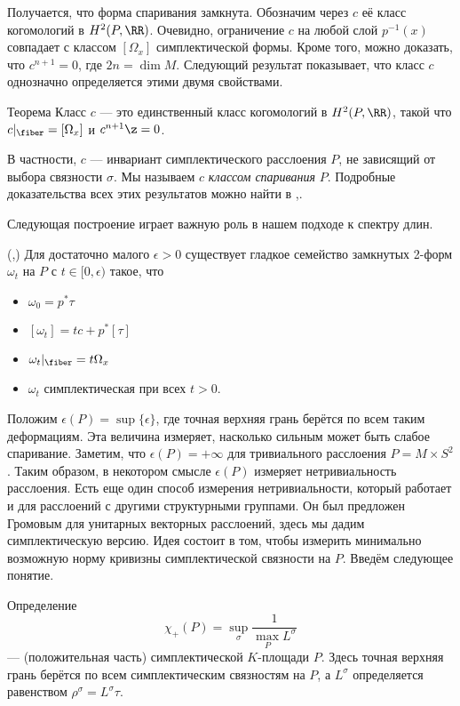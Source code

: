 Получается, что форма спаривания замкнута.
Обозначим через $c$ её класс когомологий в $H^2 (P, \RR)$.
Очевидно, ограничение $c$ на любой слой $p^{-1}(x)$ совпадает с классом $[\Omega_x]$ симплектической формы.
Кроме того, можно доказать, что $c^{n+1} = 0$, где $2n = \dim M$.
Следующий результат показывает, что класс $c$ однозначно определяется этими двумя свойствами.

\begin{thm}{Теорема}\label{9.3.A}
Класс $c$ --- это единственный класс когомологий в $H^2 (P, \RR)$, такой что $c|_\fiber = [\Omega_x]$ и $c^{n+1} \z= 0$.
\end{thm}

В частности, $c$ --- инвариант симплектического расслоения $P$, не зависящий от выбора связности $\sigma$.
Мы называем $c$ \emph{классом спаривания} $P$.
Подробные доказательства всех этих результатов можно найти в \cite{GLS},\cite{MS}.

Следующая построение играет важную роль в нашем подходе к спектру длин.

(\cite{GLS},\cite{MS})
Для достаточно малого $\epsilon > 0$ существует гладкое семейство замкнутых 2-форм $\omega_t$ на $P$ с $t \in [0, \epsilon)$ такое, что
\begin{itemize}
\item $\omega_0 = p^\ast \tau$
\item $[\omega_t] = tc + p^\ast [\tau]$
\item $\omega_t|_\fiber = t\Omega_x$
\item $\omega_t$ симплектическая при всех $t > 0$.
\end{itemize}

Положим $\epsilon(P) = \sup \{\epsilon\}$, где точная верхняя грань берётся по всем таким деформациям.
Эта величина измеряет, насколько сильным может быть слабое спаривание.
Заметим, что $\epsilon(P) = +\infty$ для тривиального расслоения $P = M \times S^2$.
Таким образом, в некотором смысле $\epsilon(P)$ измеряет нетривиальность расслоения.
Есть еще один способ измерения нетривиальности, который работает и для расслоений с другими структурными группами.
Он был предложен Громовым \cite{G2} для унитарных векторных расслоений, здесь мы дадим симплектическую версию.
Идея состоит в том, чтобы измерить минимально возможную норму кривизны симплектической связности на $P$.
Введём следующее понятие.

\begin{thm*}{Определение}
\[\chi_+ (P) = \sup_\sigma \frac1{\max_P L^\sigma}\]
--- (положительная часть) симплектической $K$-площади $P$.
Здесь точная верхняя грань берётся по всем симплектическим связностям на $P$, а $L^\sigma$ определяется равенством $\rho^\sigma = L^\sigma \tau$.
\end{thm*}

